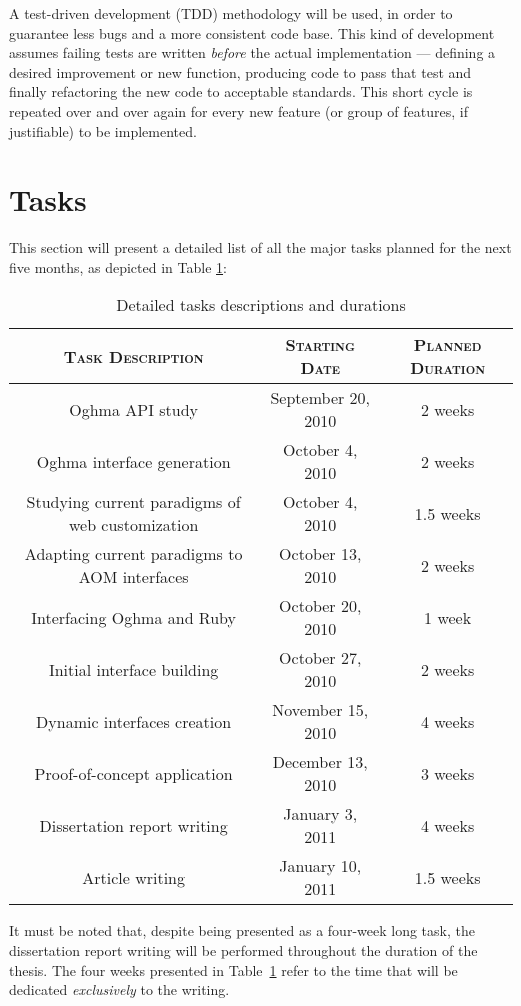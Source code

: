 A test-driven development (TDD) methodology will be used, in order to guarantee less bugs and a more consistent code base. This kind of development assumes failing tests are written \emph{before} the actual implementation --- defining a desired improvement or new function, producing code to pass that test and finally refactoring the new code to acceptable standards. This short cycle is repeated over and over again for every new feature (or group of features, if justifiable) to be implemented.

\section{Tasks}\label{sec:tasks}

This section will present a detailed list of all the major tasks planned for the next five months, as depicted in Table \ref{table:tasks}:

\begin{table}[H]
  \centering
  \begin{tabular}{c|c|c}
    \textbf{\textsc{Task Description}} & \textbf{\textsc{Starting Date}} & \textbf{\textsc{Planned Duration}}\\
    \hline
    \hline
    Oghma API study                                 & September 20, 2010  & 2 weeks\\\hline
    Oghma interface generation                      & October 4, 2010     & 2 weeks\\\hline
    Studying current paradigms of web customization & October 4, 2010     & 1.5 weeks\\\hline
    Adapting current paradigms to AOM interfaces    & October 13, 2010    & 2 weeks\\\hline
    Interfacing Oghma and Ruby                      & October 20, 2010    & 1 week\\\hline
    Initial interface building                      & October 27, 2010    & 2 weeks\\\hline
    Dynamic interfaces creation                     & November 15, 2010   & 4 weeks\\\hline
    Proof-of-concept application                    & December 13, 2010   & 3 weeks\\\hline
    Dissertation report writing                     & January 3, 2011     & 4 weeks\\\hline
    Article writing                                 & January 10, 2011    & 1.5 weeks\\\hline
  \end{tabular}
  \vspace{3mm}
  \caption{Detailed tasks descriptions and durations}
  \label{table:tasks}
\end{table}

It must be noted that, despite being presented as a four-week long task, the dissertation report writing will be performed throughout the duration of the thesis. The four weeks presented in Table~\ref{table:tasks} refer to the time that will be dedicated \emph{exclusively} to the writing.

